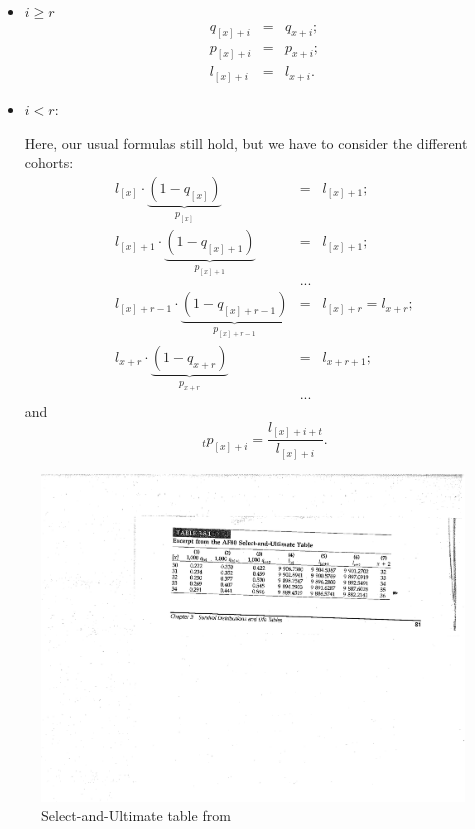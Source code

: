 \documentclass[11pt,fleqn,oneside]{book}
\begin{document}
\begin{itemize}
\item $i \geq r$
\begin{eqnarray*}
q_{[x]+i} &=& q_{x+i};\\
p_{[x]+i} &=& p_{x+i};\\
l_{[x]+i} &=& l_{x+i}.
\end{eqnarray*}
\item $i < r$:

Here, our usual formulas still hold, but we have to consider the different cohorts:
\begin{eqnarray*}
l_{[x]} \cdot \underbrace{(1-q_{[x]})}_{p_{[x]}} &=& l_{[x]+1}; \\
l_{[x]+1} \cdot \underbrace{(1-q_{[x]+1})}_{p_{[x]+1}} &=& l_{[x]+1};\\
&...&\\
l_{[x]+r-1} \cdot \underbrace{(1-q_{[x]+r-1})}_{p_{[x]+r-1}} &=& l_{[x]+r} = l_{x+r};\\
l_{x+r} \cdot \underbrace{(1-q_{x+r})}_{p_{x+r}} &=& l_{x+r+1}; \\
&...&
\end{eqnarray*}
and 
$$
{_tp_{[x]+i}} = \frac{l_{[x]+i+t}}{l_{[x]+i}}.
$$
\end{itemize}

\begin{figure}
\begin{center}
\includegraphics{Graphs/Select.pdf}
\end{center}
\caption{Select-and-Ultimate table from \cite{BOWERS} \label{FIGSELUL}}
\end{figure}
\end{document}

